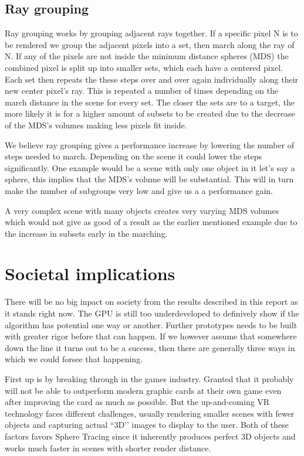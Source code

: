 		\subsection{Ray grouping}
		
			Ray grouping works by grouping adjacent rays together. If a
			specific pixel N is to be rendered we group the adjacent pixels
			into a set, then march along the ray of N. If any of the pixels are
			not inside the minimum distance spheres (MDS) the combined pixel is
			split up into smaller sets, which each have a centered pixel. Each
			set then repeats the these steps over and over again individually
			along their new center pixel's ray.  This is repeated a number of
			times depending on the march distance in the scene for every set.
			The closer the sets are to a target, the more likely it is for a
			higher amount of subsets to be created due to the decrease of the
			MDS's volumes making less pixels fit inside.
			
			We believe ray grouping gives a performance increase by lowering
			the number of steps needed to march. Depending on the scene it
			could lower the steps significantly. One example would be a scene
			with only one object in it let's say a sphere, this implies that
			the MDS's volume will be substantial. This will in turn make the
			number of subgroups very low and give us a a performance gain. 
			
			A very complex scene with many objects creates very varying MDS
			volumes which would not give as good of a result as the earlier
			mentioned example due to the increase in subsets early in the
			marching.

	\section{Societal implications}

		There will be no big inpact on society from the results described in
		this report as it stands right now. The GPU is still too underdeveloped
		to definively show if the algorithm has potential one way or another.
		Further prototypes needs to be built with greater rigor before that can
		happen.  If we however assume that somewhere down the line it turns out
		to be a success, then there are generally three ways in which we could
		forsee that happening.

		First up is by breaking through in the games industry. Granted that it
		probably will not be able to outperform modern graphic cards at their own
		game even after improving the card as much as possible. But the
		up-and-coming VR technology faces different challenges, usually rendering
		smaller scenes with fewer objects and capturing actual ``3D’’ images to
		display to the user. Both of these factors favors Sphere Tracing since it
		inherently produces perfect 3D objects and works much faster in scenes with
		shorter render distance.

